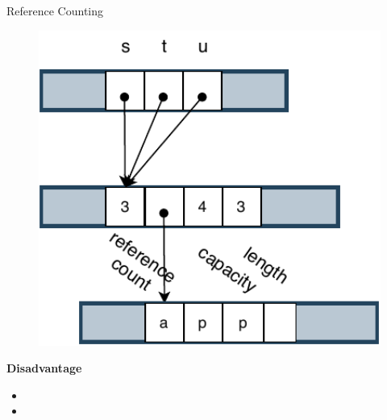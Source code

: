 \documentclass[9pt]{beamer}
\begin{document}
\begin{frame}[fragile]{Reference Counting}
\begin{minipage}{0.3\linewidth}
\begin{figure}[hp]
        \end{figure}
    \end{minipage}
    \begin{minipage}{0.3\linewidth}
        \begin{figure}[hp]
            \centering
            \begin{center}
                    \includegraphics[width=1.0\textwidth]{images/rc3.pdf}
                    \captionsetup{labelformat=empty}
            \end{center}
            
        \end{figure}
    \end{minipage}
    \vspace{0.5cm}

    \textbf{Disadvantage}
    \begin{itemize}
        \item {} 
        \item {}
    \end{itemize}


\end{frame}


\end{document}
